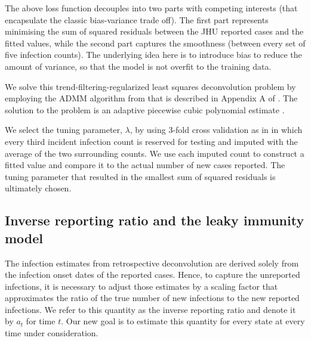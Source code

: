 \documentclass{article}
\begin{document}
The above loss function decouples into two parts with competing interests (that
encapsulate the classic bias-variance trade off). The first part represents
minimising the sum of squared residuals between the JHU reported cases and the
fitted values, while the second part captures the smoothness (between every set
of five infection counts). The underlying idea here is to introduce bias to
reduce the amount of variance, so that the model is not overfit to the training
data.

We solve this trend-filtering-regularized least squares deconvolution problem by
employing the ADMM algorithm from \citet{ramdas2016fast} that is described in
Appendix A of \citet{jahja2022real}. The solution to the problem is an adaptive
piecewise cubic polynomial estimate \citep{tibshirani2014adaptive,
tibshirani2022divided}.

We select the tuning parameter, $\lambda$, by using $3$-fold cross validation as
in \citet{jahja2022real} in which every third incident infection count is
reserved for testing and imputed with the average of the two surrounding counts.
We use each imputed count to construct a fitted value and compare it to the
actual number of new cases reported. The tuning parameter that resulted in the
smallest sum of squared residuals is ultimately chosen.

\subsection{Inverse reporting ratio and the leaky immunity model} 

The infection estimates from retrospective deconvolution are
derived solely from the infection onset dates of the reported cases. Hence,
to capture the unreported infections, it is necessary to adjust those estimates by 
a scaling factor that approximates the ratio of the true number of new infections
to the new reported infections. We refer to this quantity as the
inverse reporting ratio and denote it by $a_t$ for time $t$. Our new goal is
to estimate this quantity for every state at every time under consideration. 
\end{document}
